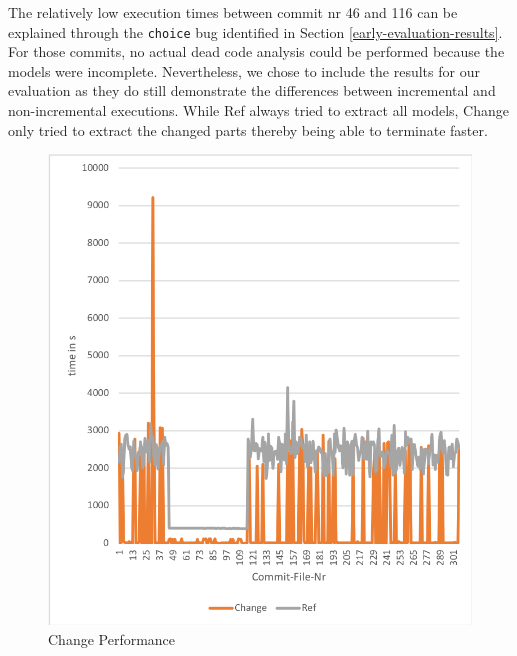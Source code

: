 \documentclass[a4paper]{article}
\begin{document}
The relatively low execution times between commit nr 46 and 116 can be explained through the \texttt{choice} bug identified in Section \ref{early-evaluation-results}. For those commits, no actual dead code analysis could be performed because the models were incomplete. Nevertheless, we chose to include the results for our evaluation as they do still demonstrate the differences between incremental and non-incremental executions. While Ref always tried to extract all models, Change only tried to extract the changed parts thereby being able to terminate faster. 

\begin{figure}[h] 
  \centering
  \begin{minipage}[b]{1\textwidth} 
    \caption[Change Performance]{Change Performance}\label{fig:change}
    \includegraphics[width=1\textwidth]{img/change-vs-ref.png}
  \end{minipage}
\end{figure}
\end{document}
